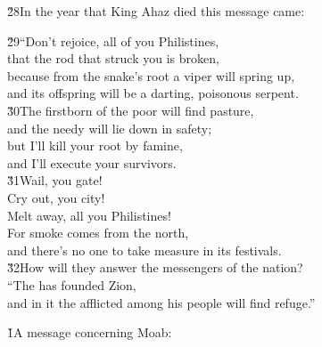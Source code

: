 \v{28}In the year that King Ahaz died this message came:

\begin{poetry}
\poeml \v{29}``Don't rejoice, all of you Philistines, \\
\poemll    that the rod that struck you is broken, \\
\poeml because from the snake's root a viper will spring up, \\
\poemll    and its offspring will be a darting, poisonous serpent. \\
\poeml \v{30}The firstborn of the poor will find pasture, \\
\poemll    and the needy will lie down in safety; \\
\poeml but I'll kill your root by famine, \\
\poemll    and I'll execute your survivors. \\
\poeml \v{31}Wail, you gate! \\
\poemll    Cry out, you city! \\
\poemlll       Melt away, all you Philistines! \\
\poeml For smoke comes from the north, \\
\poemll    and there's no one to take measure in its festivals. \\
\poeml \v{32}How will they answer the messengers of the nation? \\
\poemll    ``The  has founded Zion, \\
\poemlll       and in it the afflicted among his people will find refuge.''
\end{poetry}

\v{1}A message concerning Moab:

